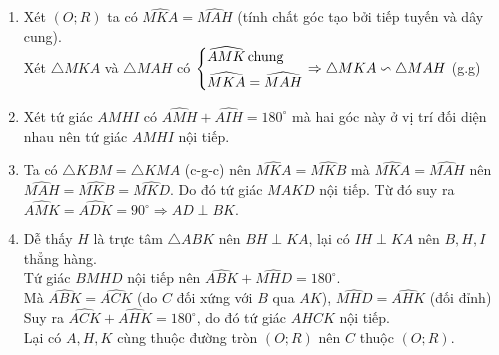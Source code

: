 \begin{ex}
{\begin{center}
	\end{center}
\begin{enumerate}
	\item Xét $(O;R)$ ta có $\widehat{MKA} =\widehat{MAH}$ (tính chất góc tạo bởi tiếp tuyến và dây cung).\\
	Xét  $\triangle MKA$ và $\triangle MAH$ có $\left\{\begin{aligned}& \widehat{AMK} \, \text{chung}\\& \widehat{MKA} =\widehat{MAH}\end{aligned}\right. \Rightarrow \triangle MKA \backsim  \triangle MAH$ (g.g) 
	\item Xét tứ giác $AMHI$ có $\widehat{AMH}+ \widehat{AIH} =180^\circ$ mà hai góc  này ở vị trí đối diện nhau nên tứ giác $AMHI$ nội tiếp.
	\item  Ta có $\triangle KBM = \triangle KMA$ (c-g-c) nên $\widehat{MKA} =\widehat{MKB}$ mà $\widehat{MKA } =\widehat{MAH}$ nên $\widehat{MAH} = \widehat{MKB} =\widehat{MKD}$. Do đó tứ giác $MAKD$ nội tiếp. Từ đó suy ra $\widehat{AMK} =\widehat{ADK} =90^\circ \Rightarrow AD \perp BK.$
	\item Dễ thấy $H$ là trực tâm $\triangle ABK$ nên $BH  \perp KA$, lại có $IH \perp KA$ nên $B, H, I$ thẳng hàng.\\
	Tứ giác $BMHD$ nội tiếp nên $\widehat{ABK}+\widehat{MHD} =180^\circ$.\\
	Mà $\widehat{ABK} =\widehat{ACK}$ (do $C$ đối xứng với $B$ qua $AK$), $\widehat{MHD} =\widehat{AHK}$ (đối đỉnh)\\
	Suy ra $\widehat{ACK} +\widehat{AHK} =180^\circ$, do đó tứ giác $AHCK$ nội tiếp.\\
	Lại có $A,H,K$ cùng thuộc đường tròn $(O;R)$ nên $C$ thuộc $(O;R)$.
	
\end{enumerate}
}

\end{ex}

